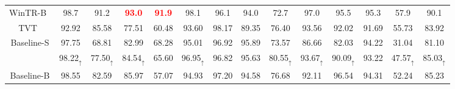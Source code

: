 \documentclass[journal]{IEEEtran}
\begin{document}
\begin{table*}[htp]
{\begin{tabular}{cccccccccccccc}
WinTR-B~\cite{ma2021exploitingWinTR}                             & 98.7                 & 91.2                                  & \textcolor{red}{\textbf{93.0}}                 & \textcolor{red}{\textbf{91.9}}                                  & 98.1                                  & 96.1                                  & 94.0                 & 72.7                                  & 97.0                                  & 95.5                                  & 95.3                                 & 57.9                                  & 90.1                                  \\
TVT~\cite{yang2021tvtTVT}                                 & 92.92                & 85.58                                 & 77.51                & 60.48                                 & 93.60                                 & 98.17                                 & 89.35                & 76.40                                 & 93.56                                 & 92.02                                 & 91.69                                & 55.73                                 & 83.92                                 \\ \hline \hline
Baseline-S                          & \multicolumn{1}{c}{97.75} & \multicolumn{1}{c}{68.81}                  & \multicolumn{1}{c}{82.99} & \multicolumn{1}{c}{68.28}                  & \multicolumn{1}{c}{95.01}                  & \multicolumn{1}{c}{96.92}                  & \multicolumn{1}{c}{95.89} & \multicolumn{1}{c}{73.57}                  & \multicolumn{1}{c}{86.66}                  & \multicolumn{1}{c}{82.03}                  & \multicolumn{1}{c}{94.22}                 & \multicolumn{1}{c}{31.04}                  & \multicolumn{1}{c}{81.10}                  \\
\rowcolor[gray]{0.9} \multicolumn{1}{c}{+Ours} & \multicolumn{1}{c}{98.22$_\uparrow$} & \multicolumn{1}{c}{77.50$_\uparrow$}                  & \multicolumn{1}{c}{84.54$_\uparrow$} & \multicolumn{1}{c}{65.60}                  & \multicolumn{1}{c}{96.95$_\uparrow$}                  & \multicolumn{1}{c}{96.82}                  & \multicolumn{1}{c}{95.63} & \multicolumn{1}{c}{80.55$_\uparrow$}                  & \multicolumn{1}{c}{93.67$_\uparrow$}                  & \multicolumn{1}{c}{90.09$_\uparrow$}                  & \multicolumn{1}{c}{93.22}                 & \multicolumn{1}{c}{47.57$_\uparrow$}                  & \multicolumn{1}{c}{85.03$_\uparrow$}                  \\ \hline


Baseline-B                          & \multicolumn{1}{c}{98.55} & \multicolumn{1}{c}{82.59}                  & \multicolumn{1}{c}{85.97} & \multicolumn{1}{c}{57.07}                  & \multicolumn{1}{c}{94.93}                  & \multicolumn{1}{c}{97.20}                  & \multicolumn{1}{l}{94.58} & \multicolumn{1}{c}{76.68}                  & \multicolumn{1}{c}{92.11}                  & \multicolumn{1}{c}{96.54}                  & \multicolumn{1}{c}{94.31}                 & \multicolumn{1}{c}{52.24}                  & \multicolumn{1}{c}{85.23}                  \\



\end{tabular}}
\end{table*}
\end{document}
